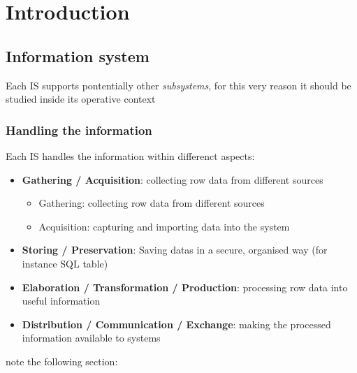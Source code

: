 \chapter{Introduction}


\section{Information system}


Each IS supports pontentially other \textit{subsystems}, for this very reason it should be studied inside its operative context
\subsection{Handling the information}
Each IS handles the information within differenct aspects:
\begin{itemize}
    \item \textbf{Gathering / Acquisition}: collecting row data from different sources
    \begin{itemize}
        \item Gathering: collecting row data from different sources
        \item  Acquisition: capturing and importing data into the system
    \end{itemize}
    \item \textbf{Storing / Preservation}: Saving datas in a secure, organised way (for instance SQL table)
    \item \textbf{Elaboration / Transformation / Production}: processing row data into useful information
    \item \textbf{Distribution / Communication / Exchange}: making the processed information available to systems 
\end{itemize}


note the following section:
